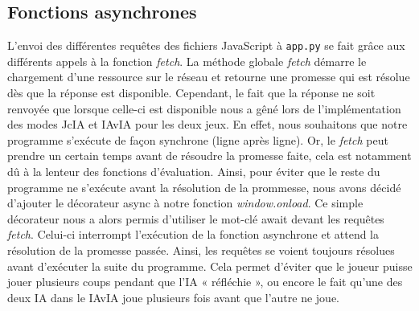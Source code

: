\subsection{Fonctions asynchrones}
L'envoi des différentes requêtes des fichiers JavaScript à \texttt{app.py} se fait grâce aux différents appels à la fonction \textit{fetch}.
La méthode globale \textit{fetch} démarre le chargement d'une ressource sur le réseau et retourne une promesse qui est résolue dès que la 
réponse est disponible. Cependant, le fait que la réponse ne soit renvoyée que lorsque celle-ci est disponible nous a gêné lors de l'implémentation
des modes JcIA et IAvIA pour les deux jeux. En effet, nous souhaitons que notre programme s'exécute de façon synchrone (ligne après ligne). 
Or, le \textit{fetch} peut prendre un certain temps avant de résoudre la promesse faite, cela est notamment dû à la lenteur des fonctions d'évaluation.
Ainsi, pour éviter que le reste du programme ne s'exécute avant la résolution de la prommesse, nous avons décidé d'ajouter le décorateur 
\textsf{async} à notre fonction \textit{window.onload}. Ce simple décorateur nous a alors permis d'utiliser le mot-clé \textsf{await} devant les requêtes \textit{fetch}.
Celui-ci interrompt l'exécution de la fonction asynchrone et attend la résolution de la promesse passée. Ainsi, les requêtes se voient toujours résolues 
avant d'exécuter la suite du programme. Cela permet d'éviter que le joueur puisse jouer plusieurs coups pendant que l'IA « réfléchie », ou encore le fait
qu'une des deux IA dans le IAvIA joue plusieurs fois avant que l'autre ne joue.
